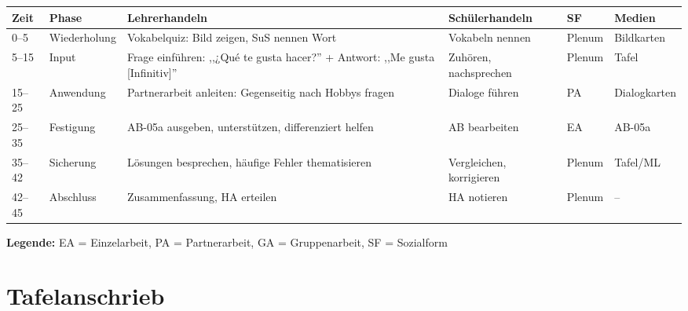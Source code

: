 \documentclass[11pt,a4paper]{article}
\begin{document}
\begin{longtable}{|p{1cm}|p{1.5cm}|p{4cm}|p{3cm}|p{2cm}|p{2cm}|}
\hline
\textbf{Zeit} & \textbf{Phase} & \textbf{Lehrerhandeln} & \textbf{Schülerhandeln} & \textbf{SF} & \textbf{Medien} \\
\hline
\endhead

0--5 & Wieder\-holung & Vokabelquiz: Bild zeigen, SuS nennen Wort & Vokabeln nennen & Plenum & Bildkarten \\
\hline

5--15 & Input & Frage einführen: ,,¿Qué te gusta hacer?'' + Antwort: ,,Me gusta [Infinitiv]'' & Zuhören, nachsprechen & Plenum & Tafel \\
\hline

15--25 & Anwen\-dung & Partnerarbeit anleiten: Gegenseitig nach Hobbys fragen & Dialoge führen & PA & Dialogkarten \\
\hline

25--35 & Festigung & AB-05a ausgeben, unterstützen, differenziert helfen & AB bearbeiten & EA & AB-05a \\
\hline

35--42 & Sicherung & Lösungen besprechen, häufige Fehler thematisieren & Vergleichen, korrigieren & Plenum & Tafel/ML \\
\hline

42--45 & Abschluss & Zusammenfassung, HA erteilen & HA notieren & Plenum & -- \\
\hline
\end{longtable}

\textbf{Legende:} EA = Einzelarbeit, PA = Partnerarbeit, GA = Gruppenarbeit, SF = Sozialform

\section{Tafelanschrieb}
\end{document}
